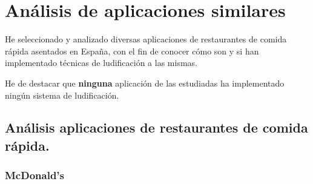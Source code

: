 \documentclass[twoside]{report}
\begin{document}
\section{Análisis de aplicaciones similares}

He seleccionado y analizado diversas aplicaciones de restaurantes de comida rápida asentados en España, con el fin de conocer cómo son y si han implementado técnicas de ludificación a las mismas.

He de destacar que \textbf{ninguna} aplicación de las estudiadas ha implementado ningún sistema de ludificación.

\subsection{Análisis aplicaciones de restaurantes de comida rápida.}
\subsubsection{McDonald's}
\end{document}
